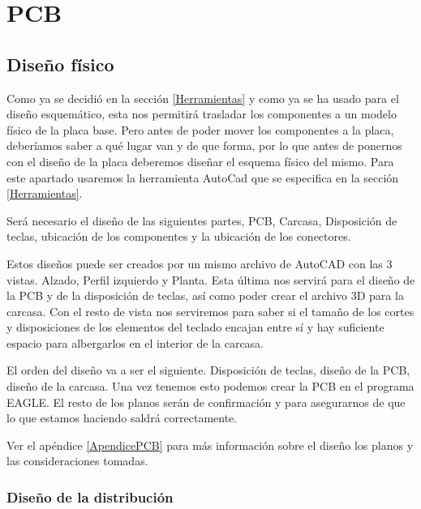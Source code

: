 \chapter{PCB}

\section{Diseño físico} \label{DiseñoFisico}

Como ya se decidió en la sección \ref{Herramientas} y como ya se ha usado para el diseño esquemático, esta nos permitirá trasladar los componentes a un modelo físico de la placa base. Pero antes de poder mover los componentes a la placa, deberíamos saber a qué lugar van y de que forma, por lo que antes de ponernos con el diseño de la placa deberemos diseñar el esquema físico del mismo. Para este apartado usaremos la herramienta AutoCad que se especifica en la sección \ref{Herramientas}.

Será necesario el diseño de las siguientes partes, \gls{PCB}, Carcasa, Disposición de teclas, ubicación de los componentes y la ubicación de los conectores.

Estos diseños puede ser creados por un mismo archivo de AutoCAD con las 3 vistas. Alzado, Perfil izquierdo y Planta. Esta última nos servirá para el diseño de la \gls{PCB} y de la disposición de teclas, así como poder crear el archivo 3D para la carcasa. Con el resto de vista nos serviremos para saber si el tamaño de los cortes y disposiciones de los elementos del teclado encajan entre sí y hay suficiente espacio para albergarlos en el interior de la carcasa.

El orden del diseño va a ser el siguiente. Disposición de teclas, diseño de la \gls{PCB}, diseño de la carcasa. Una vez tenemos esto podemos crear la \gls{PCB} en el programa EAGLE. El resto de los planos serán de confirmación y para asegurarnos de que lo que estamos haciendo saldrá correctamente.

\begin{tcolorbox}[colback=blue!5!white, colframe=blue!55!white, title=Nota]
    Ver el apéndice \ref{ApendicePCB} para más información sobre el diseño los planos y las consideraciones tomadas. 
\end{tcolorbox}

\newpage
\subsection{Diseño de la distribución} \label{CreacionPlanoDistribucion}

